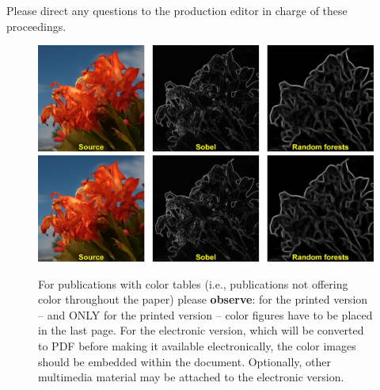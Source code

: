 \documentclass{egpubl}
\begin{document}
Please direct any questions to the production editor in charge of
these proceedings.


%




\newpage


\begin{figure}[tbp]
  \centering
  \mbox{} \hfill
  \includegraphics[width=.3\linewidth]{figs/01.jpg}
  \hfill
  \includegraphics[width=.3\linewidth]{figs/01.jpg}
  \hfill \mbox{}
  \caption{\label{fig:ex3}%
           For publications with color tables (i.e., publications not offering
           color throughout the paper) please \textbf{observe}:
           for the printed version -- and ONLY for the printed
           version -- color figures have to be placed in the last page.
           \newline
           For the electronic version, which will be converted to PDF before
           making it available electronically, the color images should be
           embedded within the document. Optionally, other multimedia
           material may be attached to the electronic version. }
\end{figure}
\end{document}
